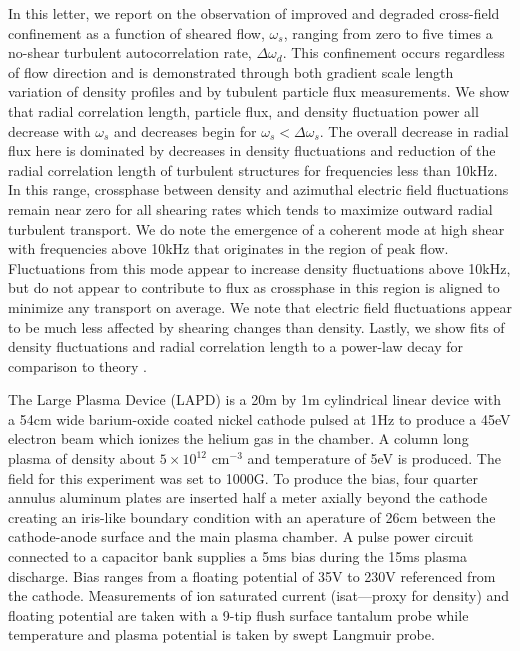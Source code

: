 \documentclass[%
 aps,
 prl,
 amsmath,amssymb,
 reprint,%
]{revtex4-1}
\begin{document}
In this letter, we report on the observation of improved and degraded cross-field confinement as a function of sheared flow, $\omega_{s}$, ranging from zero to five times a no-shear turbulent autocorrelation rate, $\Delta \omega_{d}$. This confinement occurs regardless of flow direction and is demonstrated through both gradient scale length variation of density profiles and by tubulent particle flux measurements. We show that radial correlation length, particle flux, and density fluctuation power all decrease with $\omega_{s}$ and decreases begin for $\omega_{s} < \Delta \omega_{s}$. The overall decrease in radial flux here is dominated by decreases in density fluctuations and reduction of the radial correlation length of turbulent structures for frequencies less than 10kHz. In this range, crossphase between density and azimuthal electric field fluctuations remain near zero for all shearing rates which tends to maximize outward radial turbulent transport. We do note the emergence of a coherent mode at high shear with frequencies above 10kHz that originates in the region of peak flow. Fluctuations from this mode appear to increase density fluctuations above 10kHz, but do not appear to contribute to flux as crossphase in this region is aligned to minimize any transport on average. We note that electric field fluctuations appear to be much less affected by shearing changes than density. Lastly, we show fits of density fluctuations and radial correlation length to a power-law decay for comparison to theory \cite{biglari90}.

The Large Plasma Device \cite{gek91} (LAPD) is a 20m by 1m cylindrical linear device with a 54cm wide barium-oxide coated nickel cathode pulsed at 1Hz to produce a 45eV electron beam which ionizes the helium gas in the chamber. A column long plasma of density about $5 \times 10^{12}$ cm$^{-3}$ and temperature of 5eV is produced. The field for this experiment was set to 1000G. To produce the bias, four quarter annulus aluminum plates are inserted half a meter axially beyond the cathode creating an iris-like boundary condition with an aperature of 26cm between the cathode-anode surface and the main plasma chamber. A pulse power circuit connected to a capacitor bank supplies a 5ms bias during the 15ms plasma discharge. Bias ranges from a floating potential of 35V to 230V referenced from the cathode. Measurements of ion saturated current (isat---proxy for density) and floating potential are taken with a 9-tip flush surface tantalum probe while temperature and plasma potential is taken by swept Langmuir probe.
\end{document}
